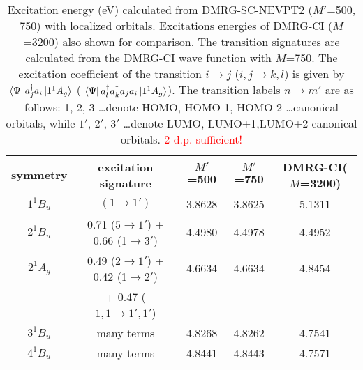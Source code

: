 \begin{table*}
  \centering
  \caption{Excitation energy (eV) calculated from DMRG-SC-NEVPT2 ($M'$=500, 750) with localized orbitals.
    Excitations energies of DMRG-CI ($M$=3200) also shown for comparison. The transition signatures are calculated from the
    DMRG-CI wave function with $M$=750. The excitation coefficient of the transition $i\rightarrow j$ ($i,j \rightarrow k,l$) is given by $\bra{\Psi}a^\dagger_j a_i\ket{1^1A_g}$ ( $\bra{\Psi}a^\dagger_l a^\dagger_k a_j a_i\ket{1^1A_g}$).
The transition labels $n\rightarrow m'$ are as follows: 1, 2, 3 \ldots denote HOMO, HOMO-1, HOMO-2 \ldots canonical orbitals, while $1'$, $2'$, $3'$ \ldots denote LUMO, LUMO+1,LUMO+2 canonical orbitals. \textcolor{red}{2 d.p. sufficient!}}
  \label{table:local}
  \begin{tabular}{ccccc}
    \hline
\hline
symmetry & excitation signature &  $M'$=500 & $M'$=750 & DMRG-CI($M$=3200) \\

\hline
$1^1B_u$ & $(1\rightarrow1')$ & 3.8628   &   3.8625   & 5.1311 \\
  $2^1B_u$ & 0.71 ($5\rightarrow 1'$) + 0.66 (1$\rightarrow 3'$) & 4.4980   &   4.4978   & 4.4952    \\
  $2^1A_g$ & 0.49 ($2\rightarrow 1'$) + 0.42 (1$\rightarrow 2'$) & 4.6634   &   4.6634   & 4.8454    \\
  &   + 0.47 ($1,1\rightarrow1',1'$)  & & &\\
  $3^1B_u$ & many terms & 4.8268   &   4.8262   & 4.7541    \\
  $4^1B_u$ & many terms & 4.8441   &   4.8443   & 4.7571    \\
\hline
\hline
\end{tabular}
\end{table*}
